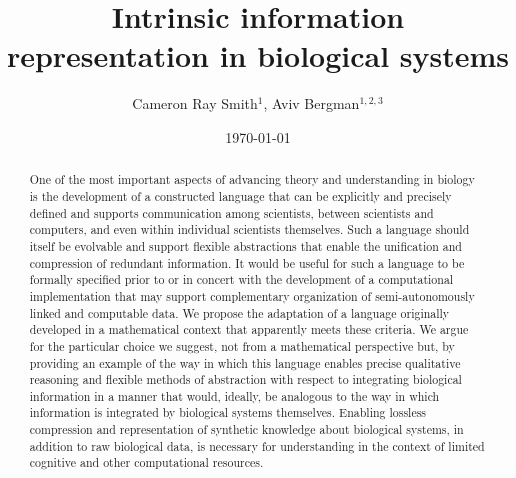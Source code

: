 \documentclass[aps,twocolumn]{revtex4}
\begin{document}
 

\title{\bf Intrinsic information representation in biological systems}

\author{Cameron Ray Smith$^{1}$, Aviv Bergman$^{1,2,3}$}


\date{\today}
\begin{abstract}
One of the most important aspects of advancing theory and understanding in biology is the development of a constructed language that can be explicitly and precisely defined and supports communication among scientists, between scientists and computers, and even within individual scientists themselves. Such a language should itself be evolvable and support flexible abstractions that enable the unification and compression of redundant information. It would be useful for such a language to be formally specified prior to or in concert with the development of a computational implementation that may support complementary organization of semi-autonomously linked and computable data. We propose the adaptation of a language originally developed in a mathematical context that apparently meets these criteria. We argue for the particular choice we suggest, not from a mathematical perspective but, by providing an example of the way in which this language enables precise qualitative reasoning and flexible methods of abstraction with respect to integrating biological information in a manner that would, ideally, be analogous to the way in which information is integrated by biological systems themselves. Enabling lossless compression and representation of synthetic knowledge about biological systems, in addition to raw biological data, is necessary for understanding in the context of limited cognitive and other computational resources.
\end{abstract}

\maketitle

\tableofcontents
\end{document}
